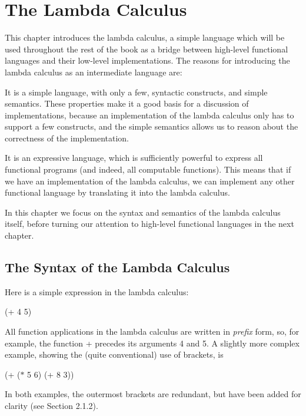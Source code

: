 \chapter{The Lambda Calculus}

This chapter introduces the lambda calculus, a simple language which will be
used throughout the rest of the book as a bridge between high-level functional
languages and their low-level implementations. The reasons for introducing
the lambda calculus as an intermediate language are:
\begin{numbered}
\item It is a simple language, with only a few, syntactic constructs, and simple
semantics. These properties make it a good basis for a discussion of
implementations, because an implementation of the lambda calculus only
has to support a few constructs, and the simple semantics allows us to
reason about the correctness of the implementation.
\item It is an expressive language, which is sufficiently powerful to express all
functional programs (and indeed, all computable functions). This means
that if we have an implementation of the lambda calculus, we can
implement any other functional language by translating it into the lambda
calculus.
\end{numbered}
In this chapter we focus on the syntax and semantics of the lambda calculus
itself, before turning our attention to high-level functional languages in the
next chapter.

\section{The Syntax of the Lambda Calculus}

Here is a simple expression in the lambda calculus:
\begin{mlcoded}
(+ 4 5)
\end{mlcoded}
All function applications in the lambda calculus are written in \textit{prefix} form, so,
for example, the function + precedes its arguments 4 and 5. A slightly more
complex example, showing the (quite conventional) use of brackets, is
\begin{mlcoded}
(+ ($*$ 5 6) (+ 8 3))
\end{mlcoded}
In both examples, the outermost brackets are redundant, but have been
added for clarity (see Section 2.1.2).

